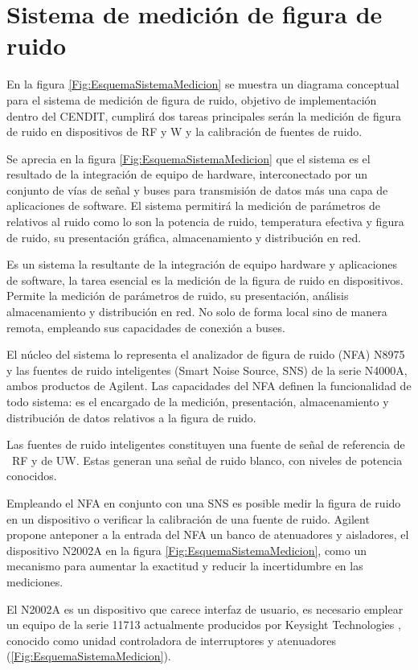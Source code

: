 \documentclass{article}
\begin{document}
	\clearpage
	\section{Sistema de medición de figura de ruido}
	En la figura \ref{Fig:EsquemaSistemaMedicion} se muestra un diagrama conceptual para el sistema de medición de figura de ruido, objetivo de implementación dentro del CENDIT, cumplirá dos tareas principales serán la medición de figura de ruido en dispositivos de RF y {\textmu}W y la calibración de fuentes de ruido.
	
	Se aprecia en la figura \ref{Fig:EsquemaSistemaMedicion} que el sistema es el resultado de la integración de equipo de hardware, interconectado por un conjunto de vías de señal y buses para transmisión de datos más una capa de aplicaciones de software. El sistema permitirá la medición de parámetros de relativos al ruido como lo son la potencia de ruido, temperatura efectiva y figura de ruido, su presentación gráfica, almacenamiento y distribución en red.
	
	Es un sistema la resultante de la integración de equipo hardware y aplicaciones de software, la tarea esencial es la	medición de la figura de ruido en dispositivos.  Permite la medición de parámetros de ruido, su presentación, análisis almacenamiento y distribución en red. No solo de forma local sino de manera remota, empleando sus capacidades de	conexión a buses.
	
	El núcleo del sistema lo representa el analizador de figura de ruido (NFA) N8975 y las fuentes de ruido inteligentes (Smart Noise Source, SNS) de la serie N4000A, ambos productos de Agilent. Las capacidades del NFA definen la funcionalidad de todo sistema: es el encargado de la medición, presentación, almacenamiento y distribución de datos relativos a la figura de ruido. 
	
	Las fuentes de ruido inteligentes constituyen una fuente de señal de referencia de \ RF y de UW. Estas generan una señal de ruido blanco, con niveles de potencia conocidos. 
	
	Empleando el NFA en conjunto con una SNS es posible medir la figura de ruido en un dispositivo o verificar la calibración de una fuente de ruido. Agilent propone anteponer a la entrada del NFA un banco de atenuadores y aisladores, el dispositivo N2002A en la figura \ref{Fig:EsquemaSistemaMedicion}, como un mecanismo para aumentar la exactitud y reducir la incertidumbre en las mediciones.
	
	El N2002A es un dispositivo que carece interfaz de usuario, es necesario emplear un equipo de la serie 11713 \textemdash actualmente producidos por Keysight Technologies \textemdash, conocido como unidad controladora de interruptores y atenuadores (\ref{Fig:EsquemaSistemaMedicion}). 
	
\end{document}

